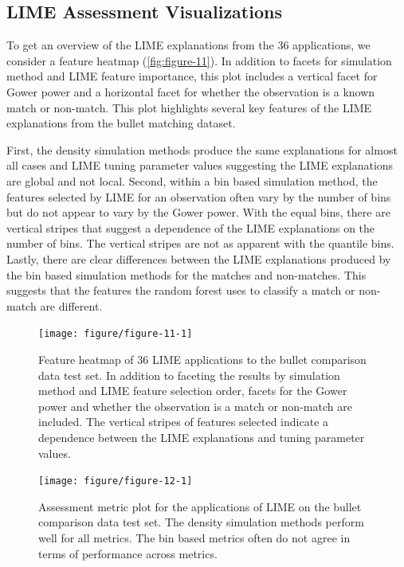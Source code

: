 \documentclass[AMS,STIX2COL]{WileyNJD-v2}\usepackage[]{graphicx}\usepackage[]{color}
\newenvironment{knitrout}{}{} %
\begin{document}
\subsection{LIME Assessment Visualizations} \label{bullet-assess-ex}

To get an overview of the LIME explanations from the 36 applications, we consider a feature heatmap (\autoref{fig:figure-11}). In addition to facets for simulation method and LIME feature importance, this plot includes a vertical facet for Gower power and a horizontal facet for whether the observation is a known match or non-match. This plot highlights several key features of the LIME explanations from the bullet matching dataset.

First, the density simulation methods produce the same explanations for almost all cases and LIME tuning parameter values suggesting the LIME explanations are global and not local. Second, within a bin based simulation method, the features selected by LIME for an observation often vary by the number of bins but do not appear to vary by the Gower power. With the equal bins, there are vertical stripes that suggest a dependence of the LIME explanations on the number of bins. The vertical stripes are not as apparent with the quantile bins. Lastly, there are clear differences between the LIME explanations produced by the bin based simulation methods for the matches and non-matches. This suggests that the features the random forest uses to classify a match or non-match are different. 

\begin{figure}[!thp]
\begin{knitrout}
\color{fgcolor}

{\centering \texttt{[image: figure/figure-11-1]} 

}



\end{knitrout}
\caption{Feature heatmap of  36 LIME applications to the bullet comparison data test set. In addition to faceting the results by simulation method and LIME feature selection order, facets for the Gower power and whether the observation is a match or non-match are included. The vertical stripes of features selected indicate a dependence between the LIME explanations and tuning parameter values.}
\label{fig:figure-11}

\vspace*{\floatsep}

\begin{knitrout}
\color{fgcolor}

{\centering \texttt{[image: figure/figure-12-1]} 

}



\end{knitrout}
\caption{Assessment metric plot for the applications of LIME on the bullet comparison data test set. The density simulation methods perform well for all metrics. The bin based metrics often do not agree in terms of performance across metrics.}
\label{fig:figure-12}
\end{figure}
\end{document}
